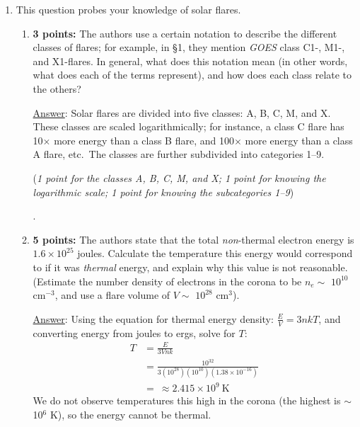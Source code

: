 \documentclass[12pt]{article}
\begin{document}
\newpage
\begin{enumerate}
    \item This question probes your knowledge of solar flares.
        \begin{enumerate}
            \item \textbf{3 points:} The authors use a certain notation to
                describe the different classes of flares; for example, in
                \S 1, they mention \emph{GOES} class C1-, M1-, and X1-flares.
                In general, what does this notation mean
                (in other words, what does each of the terms represent),
                and how does each class relate to the others?

                {\small \underline{Answer}: Solar flares are divided
                into five classes: A, B, C, M, and X. These classes are
                scaled logarithmically; for instance, a class C flare has
                10$\times$ more energy than a class B flare, and
                100$\times$ more energy than a class A flare, etc.\ The
                classes are further subdivided into categories 1--9.

                (\emph{1 point for the classes A, B, C, M, and X\@; 1 point
                for knowing the logarithmic scale; 1 point for knowing
                the subcategories 1--9})}.

            \item \textbf{5 points:} The authors state that the total
                \emph{non}-thermal electron
                energy is $1.6\times10^{25}$ joules. Calculate the
                temperature this energy would correspond to if it was
                \emph{thermal} energy, and explain why this value is not
                reasonable. (Estimate the number density of electrons in the
                corona to be $n_e \sim$ $10^{10}$ cm$^{-3}$, and use a flare
                volume of $V \sim$ $10^{28}$ cm$^3$).

                {\small \underline{Answer}: Using the equation for thermal
                    energy density: $\frac{E}{V} = 3nkT$, and converting energy
                    from joules to ergs, solve for $T$:
                    \begin{align*}
                        T &= \frac{E}{3Vnk}\\
                        &= \frac{10^{32}}{3(10^{28})(10^{10})(1.38\times10^{-16})}\\
                        &= \ \approx 2.415\times10^{9}\ \textrm{K}
                    \end{align*}
                    We do not observe temperatures this high in the corona
                    (the highest is $\sim$ 10$^{6}$ K), so
                    the energy cannot be thermal.

}
\end{enumerate}
\end{enumerate}
\end{document}
